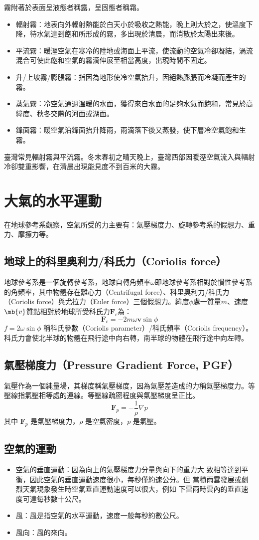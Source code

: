 \documentclass[a4paper,12pt]{report}
\begin{document}
霧附著於表面呈液態者稱露，呈固態者稱霜。
\begin{itemize}
\item 輻射霧：地表向外輻射熱能於白天小於吸收之熱能，晚上則大於之，使溫度下降，待水氣達到飽和所形成的霧，多出現於清晨，而消散於太陽出來後。
\item 平流霧：暖溼空氣在寒冷的陸地或海面上平流，使流動的空氣冷卻凝結，渦流混合可使此飽和空氣的霧滴伸展至相當高度，出現時間不固定。
\item 升/上坡霧/膨脹霧：指因為地形使冷空氣抬升，因絕熱膨脹而冷凝而產生的霧。
\item 蒸氣霧：冷空氣通過溫暖的水面，獲得來自水面的足夠水氣而飽和，常見於高緯度、秋冬交際的河面或湖面。
\item 鋒面霧：暖空氣沿鋒面抬升降雨，雨滴落下後又蒸發，使下層冷空氣飽和生霧。
\end{itemize}
臺灣常見輻射霧與平流霧。冬末春初之晴天晚上，臺灣西部因暖溼空氣流入與輻射冷卻雙重影響，在清晨出現能見度不到百米的大霧。
\section{大氣的水平運動}
在地球參考系觀察，空氣所受的力主要有：氣壓梯度力、旋轉參考系的假想力、重力、摩擦力等。
\subsection{地球上的科里奥利力/科氏力（Coriolis force）}
地球參考系是一個旋轉參考系，地球自轉角頻率$\omega$即地球參考系相對於慣性參考系的角頻率，其中物體存在離心力（Centrifugal force）、科里奥利力/科氏力（Coriolis force）與尤拉力（Euler force）三個假想力。緯度$\phi$處一質量$m$、速度$\mb{v}$質點相對於地球所受科氏力$\mathbf{F}_c$為：
\[ \mathbf{F}_c = -2m\omega \mathbf{v} \sin \phi \]
\(f = 2\omega \sin \phi\) 稱科氏參數（Coriolis parameter）/科氏頻率（Coriolis frequency）。科氏力會使北半球的物體在飛行途中向右轉，南半球的物體在飛行途中向左轉。
\subsection{氣壓梯度力（Pressure Gradient Force, PGF）}
氣壓作為一個純量場，其梯度稱氣壓梯度，因為氣壓差造成的力稱氣壓梯度力。等壓線指氣壓相等處的連線。等壓線疏密程度與氣壓梯度呈正比。
\[ \mathbf{F}_p = -\frac{1}{\rho} \nabla p \]
其中 $\mathbf{F}_p$ 是氣壓梯度力，\(\rho\) 是空氣密度，\(p\) 是氣壓。
\subsection{空氣的運動}
\begin{itemize}
  \item 空氣的垂直運動：因為向上的氣壓梯度力分量與向下的重力大 致相等達到平衡，因此空氣的垂直運動速度很小，每秒僅約速公分。但 當積雨雲發展或劇烈天氣現象發生時空氣垂直運動速度可以很大，例如 下雷雨時雲內的垂直速度可達每秒數十公尺。
  \item 風：風是指空氣的水平運動，速度一般每秒約數公尺。
  \item 風向：風的來向。
\end{itemize}
\end{document}
